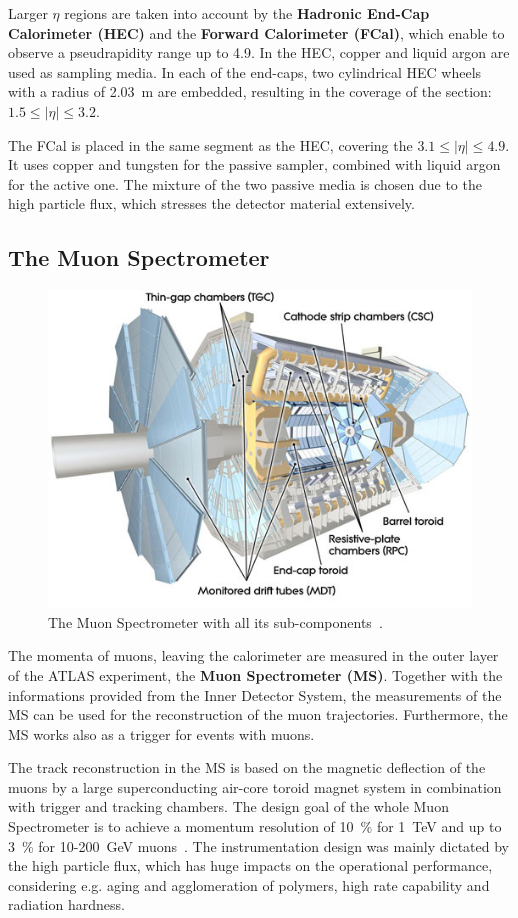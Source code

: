  Larger $\eta$ regions are taken into account by the \textbf{Hadronic End-Cap Calorimeter (HEC)} and the \textbf{Forward Calorimeter (FCal)}, which enable to observe a pseudrapidity range up to 4.9.  In the HEC, copper and liquid argon are used as sampling media. In each of the end-caps, two cylindrical HEC wheels with a radius of 2.03~m are embedded, resulting in the coverage of the section: $1.5 \leq \mid\eta\mid \leq3.2$.

 The FCal is placed in the same segment as the HEC, covering the $3.1 \leq \mid\eta\mid \leq 4.9$. It uses copper and tungsten for the passive sampler, combined with liquid argon for the active one. The mixture of the two passive media is chosen due to the high particle flux, which stresses the detector material extensively.




\subsection{The Muon Spectrometer}\label{MD}

\begin{figure}[h]
	\centering
	\includegraphics[width=0.65\linewidth]{Pics/cp3/36}
	\caption{The Muon Spectrometer with all its sub-components~\cite{Aad:2008zzm}.} 
	\label{fig:36}
\end{figure}

 The momenta of muons, leaving the calorimeter are measured in the outer layer of the ATLAS experiment, the \textbf{Muon Spectrometer (MS)}. Together with the informations provided from the Inner Detector System, the measurements of the MS can be used for the reconstruction of the muon trajectories. Furthermore, the MS works also as a trigger for events with muons.

The track reconstruction in the MS is based on the magnetic deflection of the muons by a large superconducting air-core toroid magnet system in combination with  trigger and tracking chambers. The design goal of the whole Muon Spectrometer is to achieve a momentum resolution of 10~\% for 1~TeV and up to 3~\% for 10-200~GeV muons~\cite{ATLAS:1999uwa}. The instrumentation design was mainly dictated by the high particle flux, which has huge impacts on the operational performance, considering e.g. aging and agglomeration of polymers, high rate capability and radiation hardness.

